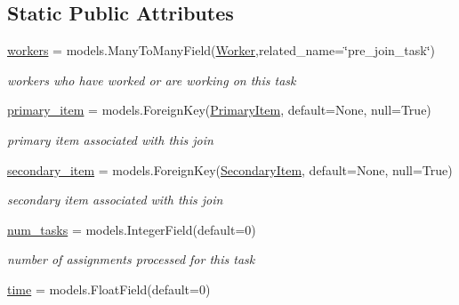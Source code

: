 \subsection*{Static Public Attributes}
\begin{DoxyCompactItemize}
\item 
\mbox{\hyperlink{classjoinapp_1_1models_1_1task__management__models_1_1_p_j_f_task_a42a0cd7f4a34b940f08fd182458c9aba}{workers}} = models.\+Many\+To\+Many\+Field(\mbox{\hyperlink{classjoinapp_1_1models_1_1task__management__models_1_1_worker}{Worker}},related\+\_\+name=\char`\"{}pre\+\_\+join\+\_\+task\char`\"{})
\begin{DoxyCompactList}\small\item\em workers who have worked or are working on this task \end{DoxyCompactList}\item 
\mbox{\hyperlink{classjoinapp_1_1models_1_1task__management__models_1_1_p_j_f_task_aba1ada8f72cc448a543f1b01551172fa}{primary\+\_\+item}} = models.\+Foreign\+Key(\textquotesingle{}\mbox{\hyperlink{classjoinapp_1_1models_1_1items_1_1_primary_item}{Primary\+Item}}\textquotesingle{}, default=None, null=True)
\begin{DoxyCompactList}\small\item\em primary item associated with this join \end{DoxyCompactList}\item 
\mbox{\hyperlink{classjoinapp_1_1models_1_1task__management__models_1_1_p_j_f_task_a0a9178a9cf48b964cab2025b9788a615}{secondary\+\_\+item}} = models.\+Foreign\+Key(\textquotesingle{}\mbox{\hyperlink{classjoinapp_1_1models_1_1items_1_1_secondary_item}{Secondary\+Item}}\textquotesingle{}, default=None, null=True)
\begin{DoxyCompactList}\small\item\em secondary item associated with this join \end{DoxyCompactList}\item 
\mbox{\hyperlink{classjoinapp_1_1models_1_1task__management__models_1_1_p_j_f_task_afc259a6f918180e978f96108b03d3411}{num\+\_\+tasks}} = models.\+Integer\+Field(default=0)
\begin{DoxyCompactList}\small\item\em number of assignments processed for this task \end{DoxyCompactList}\item 
\mbox{\hyperlink{classjoinapp_1_1models_1_1task__management__models_1_1_p_j_f_task_a70c092a6aebace0b1ea406e14da78a40}{time}} = models.\+Float\+Field(default=0)

\end{DoxyCompactItemize}
